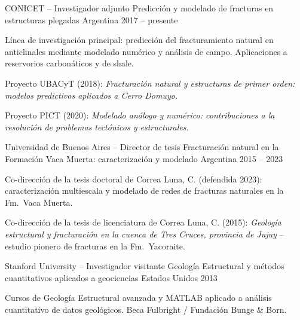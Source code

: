 
\begin{cventries}

\cventry
    {CONICET -- Investigador adjunto}
    {Predicción y modelado de fracturas en estructuras plegadas}
    {Argentina}
    {2017 -- presente}
    {
      \begin{cvitems}
        \item {Línea de investigación principal: predicción del fracturamiento natural en anticlinales mediante modelado numérico y análisis de campo. Aplicaciones a reservorios carbonáticos y de shale.}
        \item {Proyecto UBACyT (2018): \textit{Fracturación natural y estructuras de primer orden: modelos predictivos aplicados a Cerro Domuyo.}}
        \item {Proyecto PICT (2020): \textit{Modelado análogo y numérico: contribuciones a la resolución de problemas tectónicos y estructurales.}}
      \end{cvitems}
    }

\cventry
    {Universidad de Buenos Aires -- Director de tesis}
    {Fracturación natural en la Formación Vaca Muerta: caracterización y modelado}
    {Argentina}
    {2015 -- 2023}
    {
      \begin{cvitems}
        \item {Co-dirección de la tesis doctoral de Correa Luna, C. (defendida 2023): caracterización multiescala y modelado de redes de fracturas naturales en la Fm.\ Vaca Muerta.}
        \item {Co-dirección de la tesis de licenciatura de Correa Luna, C. (2015): \textit{Geología estructural y fracturación en la cuenca de Tres Cruces, provincia de Jujuy} -- estudio pionero de fracturas en la Fm.\ Yacoraite.}
      \end{cvitems}
    }

\cventry
    {Stanford University -- Investigador visitante}
    {Geología Estructural y métodos cuantitativos aplicados a geociencias}
    {Estados Unidos}
    {2013}
    {
      \begin{cvitems}
        \item {Cursos de Geología Estructural avanzada y MATLAB aplicado a análisis cuantitativo de datos geológicos. Beca Fulbright / Fundación Bunge \& Born.}
      \end{cvitems}
    }

\end{cventries}
